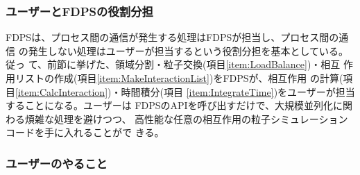 
\subsubsection{ユーザーとFDPSの役割分担}

FDPSは、プロセス間の通信が発生する処理はFDPSが担当し、プロセス間の通信
の発生しない処理はユーザーが担当するという役割分担を基本としている。従っ
て、前節に挙げた、領域分割・粒子交換(項目\ref{item:LoadBalance})・相互
作用リストの作成(項目\ref{item:MakeInteractionList})をFDPSが、相互作用
の計算(項目\ref{item:CalcInteraction})・時間積分(項目
\ref{item:IntegrateTime})をユーザーが担当することになる。ユーザーは
FDPSのAPIを呼び出すだけで、大規模並列化に関わる煩雑な処理を避けつつ、
高性能な任意の相互作用の粒子シミュレーションコードを手に入れることがで
きる。

\subsubsection{ユーザーのやること}


